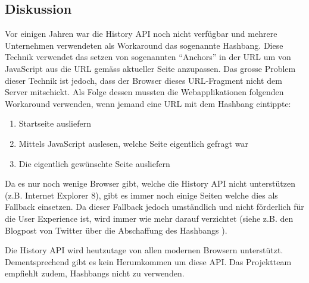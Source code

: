 \subsection*{Diskussion}
Vor einigen Jahren war die History API noch nicht verfügbar und mehrere Unternehmen verwendeten als Workaround das sogenannte \gls{Hashbang}. Diese Technik verwendet das setzen von sogenannten ``Anchors'' in der URL um von JavaScript aus die \gls{URL} gemäss aktueller Seite anzupassen. Das grosse Problem dieser Technik ist jedoch, dass der Browser dieses \gls{URL}-Fragment nicht dem Server mitschickt.
Als Folge dessen mussten die Webapplikationen folgenden Workaround verwenden, wenn jemand eine URL mit dem Hashbang eintippte:

\begin{enumerate}
	\item Startseite ausliefern
	\item Mittels JavaScript auslesen, welche Seite eigentlich gefragt war
	\item Die eigentlich gewünschte Seite ausliefern
\end{enumerate}

Da es nur noch wenige Browser gibt, welche die History API nicht unterstützen (z.B. Internet Explorer 8), gibt es immer noch einige Seiten welche dies als Fallback einsetzen. Da dieser Fallback jedoch umständlich und nicht förderlich für die User Experience ist, wird immer wie mehr darauf verzichtet (siehe z.B. den Blogpost von Twitter über die Abschaffung des Hashbangs \cite{twitterAbandonsHashbangs}).

Die History API wird heutzutage von allen modernen Browsern unterstützt. Dementsprechend gibt es kein Herumkommen um diese API. Das Projektteam
empfiehlt zudem, Hashbangs nicht zu verwenden.